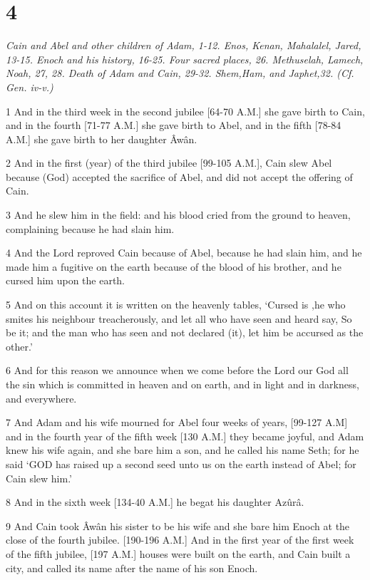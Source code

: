 \chapter{4}

\par \textit{Cain and Abel and other children of Adam, 1-12. Enos, Kenan, Mahalalel, Jared, 13-15. Enoch and his history, 16-25. Four sacred places, 26. Methuselah, Lamech, Noah, 27, 28. Death of Adam and Cain, 29-32. Shem,Ham, and Japhet,32. (Cf. Gen. iv-v.)}

\par 1 And in the third week in the second jubilee [64-70 A.M.] she gave birth to Cain, and in the fourth [71-77 A.M.] she gave birth to Abel, and in the fifth [78-84 A.M.] she gave birth to her daughter Âwân.
\par 2 And in the first (year) of the third jubilee [99-105 A.M.], Cain slew Abel because (God) accepted the sacrifice of Abel, and did not accept the offering of Cain.
\par 3 And he slew him in the field: and his blood cried from the ground to heaven, complaining because he had slain him.
\par 4 And the Lord reproved Cain because of Abel, because he had slain him, and he made him a fugitive on the earth because of the blood of his brother, and he cursed him upon the earth.
\par 5 And on this account it is written on the heavenly tables, ‘Cursed is ,he who smites his neighbour treacherously, and let all who have seen and heard say, So be it; and the man who has seen and not declared (it), let him be accursed as the other.’
\par 6 And for this reason we announce when we come before the Lord our God all the sin which is committed in heaven and on earth, and in light and in darkness, and everywhere.
\par 7 And Adam and his wife mourned for Abel four weeks of years, [99-127 A.M] and in the fourth year of the fifth week [130 A.M.] they became joyful, and Adam knew his wife again, and she bare him a son, and he called his name Seth; for he said ‘GOD has raised up a second seed unto us on the earth instead of Abel; for Cain slew him.’
\par 8 And in the sixth week [134-40 A.M.] he begat his daughter Azûrâ.
\par 9 And Cain took Âwân his sister to be his wife and she bare him Enoch at the close of the fourth jubilee. [190-196 A.M.] And in the first year of the first week of the fifth jubilee, [197 A.M.] houses were built on the earth, and Cain built a city, and called its name after the name of his son Enoch.
